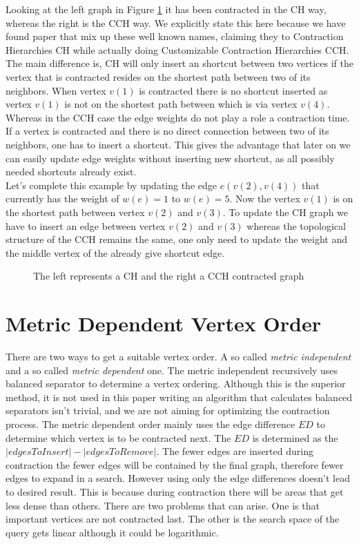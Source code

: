Looking at the left graph in Figure \ref*{fig:DifferenceCHAndCCH} it has been contracted in the CH way, whereas the right is the CCH way. We explicitly state this here because 
we have found paper \cite{Ouyang_2020} that mix up these well known names, claiming they to Contraction Hierarchies CH while actually doing Customizable Contraction Hierarchies CCH. 
The main difference is, CH will only insert an shortcut between two vertices if the vertex that is contracted resides on the shortest path between two of its neighbors. 
When vertex $v(1)$ is contracted there is no shortcut inserted as vertex $v(1)$ is not on the shortest path between which is via vertex $v(4)$.
\\
Whereas in the CCH case the edge weights do not play a role a contraction time. If a vertex is contracted and there is no direct connection between two of its neighbors, one has to insert a shortcut. This gives
the advantage that later on we can easily update edge weights without inserting new shortcut, as all possibly needed shortcuts already exist.
\\ 
Let's complete this example by updating the edge $e(v(2), v(4))$ that currently has the weight of $w(e)=1$ to $w(e) = 5$. Now the vertex $v(1)$ is on the shortest path between vertex $v(2)$ and $v(3)$. 
To update the CH graph we have to insert an edge between vertex $v(2)$ and $v(3)$ whereas the topological structure of the CCH remains the same, one only need to update the weight and the middle vertex of the already give shortcut edge.

\begin{figure}
    \centering
    
    \caption{The left represents a CH and the right a CCH contracted graph}
    \label{fig:DifferenceCHAndCCH}
\end{figure}

\section{Metric Dependent Vertex Order}
There are two ways to get a suitable vertex order. A so called \textit{metric independent} and a so called \textit{metric dependent} one. The metric independent recursively uses balanced separator to determine a vertex ordering\cite{CCH}. Although this is the superior method, it is not used in this paper writing an algorithm that calculates balanced separators isn't trivial, and we are not aiming for optimizing the contraction process. 
The metric dependent order mainly uses the edge difference $ED$ to determine which vertex is to be contracted next. The $ED$ is determined as the $|edges To Insert| - |edges To Remove|$. The fewer edges are inserted during contraction the fewer edges will be contained by the final graph, therefore fewer edges to expand in a search. However using only the edge differences doesn't lead to desired result. This is because during contraction there will be areas that get less dense than others. 
There are two problems that can arise. One is that important vertices are not contracted last. The other is the search space of the query gets linear although it could be logarithmic.

